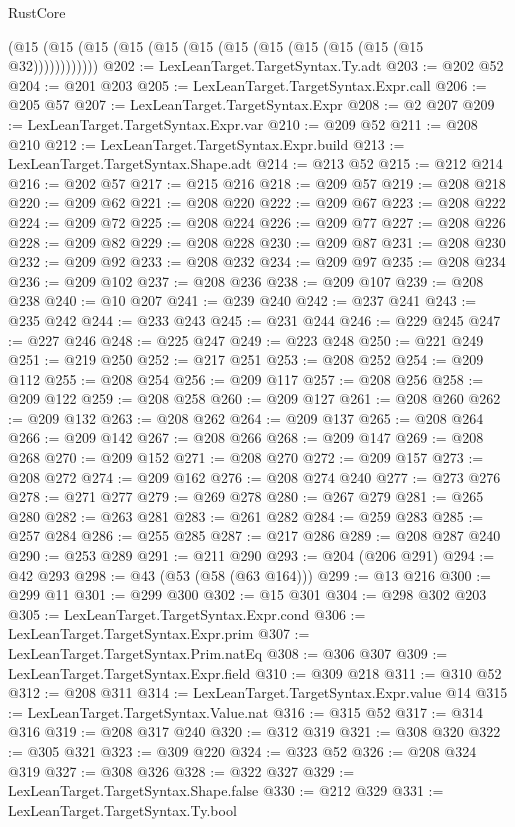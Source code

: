 \begin{lexlean}{RustCore}
\begin{coremodule}
    (@15 (@15 (@15 (@15 (@15 (@15 (@15 (@15 (@15 (@15 (@15 (@15 @32))))))))))))
@202 := LexLeanTarget.TargetSyntax.Ty.adt
@203 := @202 @52
@204 := @201 @203
@205 := LexLeanTarget.TargetSyntax.Expr.call
@206 := @205 @57
@207 := LexLeanTarget.TargetSyntax.Expr
@208 := @2 @207
@209 := LexLeanTarget.TargetSyntax.Expr.var
@210 := @209 @52
@211 := @208 @210
@212 := LexLeanTarget.TargetSyntax.Expr.build
@213 := LexLeanTarget.TargetSyntax.Shape.adt
@214 := @213 @52
@215 := @212 @214
@216 := @202 @57
@217 := @215 @216
@218 := @209 @57
@219 := @208 @218
@220 := @209 @62
@221 := @208 @220
@222 := @209 @67
@223 := @208 @222
@224 := @209 @72
@225 := @208 @224
@226 := @209 @77
@227 := @208 @226
@228 := @209 @82
@229 := @208 @228
@230 := @209 @87
@231 := @208 @230
@232 := @209 @92
@233 := @208 @232
@234 := @209 @97
@235 := @208 @234
@236 := @209 @102
@237 := @208 @236
@238 := @209 @107
@239 := @208 @238
@240 := @10 @207
@241 := @239 @240
@242 := @237 @241
@243 := @235 @242
@244 := @233 @243
@245 := @231 @244
@246 := @229 @245
@247 := @227 @246
@248 := @225 @247
@249 := @223 @248
@250 := @221 @249
@251 := @219 @250
@252 := @217 @251
@253 := @208 @252
@254 := @209 @112
@255 := @208 @254
@256 := @209 @117
@257 := @208 @256
@258 := @209 @122
@259 := @208 @258
@260 := @209 @127
@261 := @208 @260
@262 := @209 @132
@263 := @208 @262
@264 := @209 @137
@265 := @208 @264
@266 := @209 @142
@267 := @208 @266
@268 := @209 @147
@269 := @208 @268
@270 := @209 @152
@271 := @208 @270
@272 := @209 @157
@273 := @208 @272
@274 := @209 @162
@276 := @208 @274 @240
@277 := @273 @276
@278 := @271 @277
@279 := @269 @278
@280 := @267 @279
@281 := @265 @280
@282 := @263 @281
@283 := @261 @282
@284 := @259 @283
@285 := @257 @284
@286 := @255 @285
@287 := @217 @286
@289 := @208 @287 @240
@290 := @253 @289
@291 := @211 @290
@293 := @204 (@206 @291)
@294 := @42 @293
@298 := @43 (@53 (@58 (@63 @164)))
@299 := @13 @216
@300 := @299 @11
@301 := @299 @300
@302 := @15 @301
@304 := @298 @302 @203
@305 := LexLeanTarget.TargetSyntax.Expr.cond
@306 := LexLeanTarget.TargetSyntax.Expr.prim
@307 := LexLeanTarget.TargetSyntax.Prim.natEq
@308 := @306 @307
@309 := LexLeanTarget.TargetSyntax.Expr.field
@310 := @309 @218
@311 := @310 @52
@312 := @208 @311
@314 := LexLeanTarget.TargetSyntax.Expr.value @14
@315 := LexLeanTarget.TargetSyntax.Value.nat
@316 := @315 @52
@317 := @314 @316
@319 := @208 @317 @240
@320 := @312 @319
@321 := @308 @320
@322 := @305 @321
@323 := @309 @220
@324 := @323 @52
@326 := @208 @324 @319
@327 := @308 @326
@328 := @322 @327
@329 := LexLeanTarget.TargetSyntax.Shape.false
@330 := @212 @329
@331 := LexLeanTarget.TargetSyntax.Ty.bool

\end{coremodule}
\end{lexlean}
